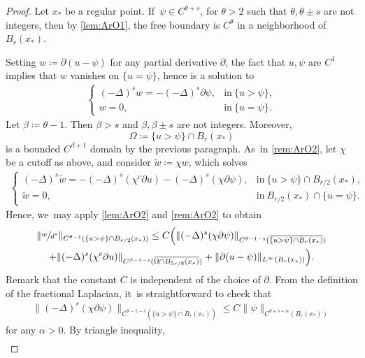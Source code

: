 \documentclass[10pt]{amsart}
\theoremstyle{plain}
\theoremstyle{definition}
\let\be\beta
\let\p\partial
\let\ol\overline
\let\tl\tilde
\begin{document}
\begin{proof}

Let $x_*$ be a regular point. If~$\psi \in C^{\theta+s}$, for $\theta>2$ such that $\theta,\theta\pm s$ are not integers, then by \cref{lem:ArO1}, the free boundary is $C^\theta$ in a neighborhood of $B_r(x_*)$.

Setting $w\coloneqq \p(u-\psi)$ for any partial derivative $\p$, the fact that $u,\psi$ are $C^1$ implies that $w$ vanishes on $\{u=\psi\}$, hence is a solution to
\begin{align*}
\begin{cases}
(-\Delta)^s w= {-}(- \Delta)^s\p\psi, & \text{in} \ \{u>\psi\}, \\
w =0, & \text{in} \ \{u=\psi\}.
\end{cases}
\end{align*}
Let $\be \coloneqq \theta-1$. Then $\be>s$ and $\be,\be\pm s$ are not integers. Moreover,
\[
\Omega \coloneqq \{u>\psi\} \cap B_{r}(x_*)
\]
is a bounded $C^{\be + 1}$ domain by the previous paragraph. As~in \cref{rem:ArO2}, let $\chi$ be a cutoff as above, and consider $\tl{w} \coloneqq \chi w$, which solves
\begin{align*}
\begin{cases}
(-\Delta)^s\tl{w}= -(- \Delta)^s(\chi^c {\p u}) {-} (- \Delta)^s(\chi\p\psi), & \text{in} \ \{u>\psi\} \cap B_{r/2}(x_*), \\
\tl{w} =0, & \text{in} \ B_{r/2}(x_*) \cap \{u=\psi\}.
\end{cases}
\end{align*}
Hence, we~may apply \cref{lem:ArO2} and \cref{rem:ArO2} to obtain
\begin{multline}\label{eq:wdsCth}
\|\sfrac{w}{d^s}\|_{C^{\theta-1}(\{u>\psi\}\cap B_{r/2}(x_*))}\le C\Big( \|(-\Delta)^s(\chi\p\psi)\|_{C^{\theta-1-s}(\ol{\{u>\psi\}\cap B_{r}(x_*)})}\\
+ \|(-\Delta)^s(\chi^c\p { u})\|_{C^{\be-1-s}(\ol{\Omega\cap B_{5r/8}(x_*)})}+ \|\p(u-\psi)\|_{L^\infty(B_{r}(x_*))}\Big).
\end{multline}
Remark that the constant $C$ is independent of the choice of $\p$. From the definition of the fractional Laplacian, it~is straightforward to check that
\begin{align*}
\|(-\Delta)^s(\chi\p\psi)\|_{C^{\theta-1-s}(\ol{\{u>\psi\}\cap B_{r}(x_*)})} \le C \|\psi\|_{C^{\theta+s+\alpha}(B_{r}(x_*))}
\end{align*}
for any $\alpha>0$. By triangle inequality,
\begin{align*}

\end{align*}
\end{proof}
\end{document}
